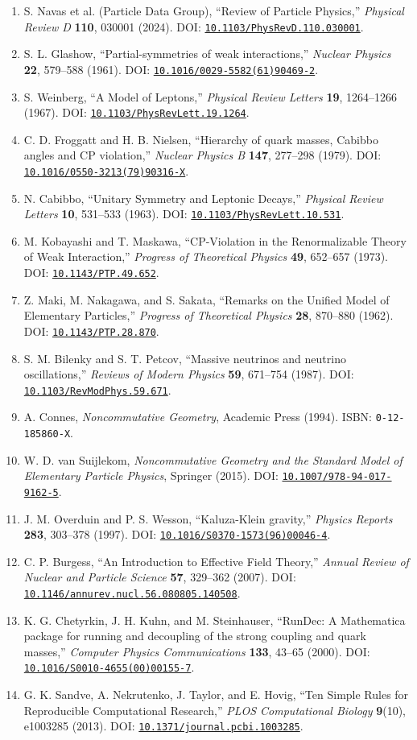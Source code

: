\documentclass[11pt]{article}
\newcommand{\doi}[1]{\href{https://doi.org/#1}{\nolinkurl{#1}}}
\begin{document}
\begin{enumerate}
\item S. Navas et al. (Particle Data Group), ``Review of Particle Physics,''
\textit{Physical Review D} \textbf{110}, 030001 (2024).
DOI: \doi{10.1103/PhysRevD.110.030001}.
\item S. L. Glashow, ``Partial-symmetries of weak interactions,''
\textit{Nuclear Physics} \textbf{22}, 579--588 (1961).
DOI: \doi{10.1016/0029-5582(61)90469-2}.
\item S. Weinberg, ``A Model of Leptons,'' \textit{Physical Review Letters}
\textbf{19}, 1264--1266 (1967). DOI: \doi{10.1103/PhysRevLett.19.1264}.
\item C. D. Froggatt and H. B. Nielsen, ``Hierarchy of quark masses, Cabibbo
angles and CP violation,'' \textit{Nuclear Physics B} \textbf{147}, 277--298
(1979). DOI: \doi{10.1016/0550-3213(79)90316-X}.
\item N. Cabibbo, ``Unitary Symmetry and Leptonic Decays,''
\textit{Physical Review Letters} \textbf{10}, 531--533 (1963).
DOI: \doi{10.1103/PhysRevLett.10.531}.
\item M. Kobayashi and T. Maskawa, ``CP-Violation in the Renormalizable Theory
of Weak Interaction,'' \textit{Progress of Theoretical Physics} \textbf{49},
652--657 (1973). DOI: \doi{10.1143/PTP.49.652}.
\item Z. Maki, M. Nakagawa, and S. Sakata, ``Remarks on the Unified Model of
Elementary Particles,'' \textit{Progress of Theoretical Physics} \textbf{28},
870--880 (1962). DOI: \doi{10.1143/PTP.28.870}.
\item S. M. Bilenky and S. T. Petcov, ``Massive neutrinos and neutrino
oscillations,'' \textit{Reviews of Modern Physics} \textbf{59}, 671--754
(1987). DOI: \doi{10.1103/RevModPhys.59.671}.
\item A. Connes, \textit{Noncommutative Geometry}, Academic Press (1994).
ISBN: \texttt{0-12-185860-X}.
\item W. D. van Suijlekom, \textit{Noncommutative Geometry and the Standard
Model of Elementary Particle Physics}, Springer (2015).
DOI: \doi{10.1007/978-94-017-9162-5}.
\item J. M. Overduin and P. S. Wesson, ``Kaluza-Klein gravity,''
\textit{Physics Reports} \textbf{283}, 303--378 (1997).
DOI: \doi{10.1016/S0370-1573(96)00046-4}.
\item C. P. Burgess, ``An Introduction to Effective Field Theory,''
\textit{Annual Review of Nuclear and Particle Science} \textbf{57}, 329--362
(2007). DOI: \doi{10.1146/annurev.nucl.56.080805.140508}.
\item K. G. Chetyrkin, J. H. Kuhn, and M. Steinhauser, ``RunDec: A Mathematica
package for running and decoupling of the strong coupling and quark masses,''
\textit{Computer Physics Communications} \textbf{133}, 43--65 (2000).
DOI: \doi{10.1016/S0010-4655(00)00155-7}.
\item G. K. Sandve, A. Nekrutenko, J. Taylor, and E. Hovig, ``Ten Simple Rules
for Reproducible Computational Research,'' \textit{PLOS Computational Biology}
\textbf{9}(10), e1003285 (2013).
DOI: \doi{10.1371/journal.pcbi.1003285}.
\end{enumerate}
\end{document}
